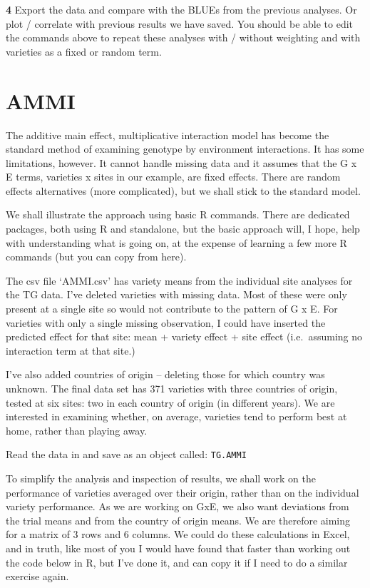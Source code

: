 \documentclass[
]{book}
\makeatletter
\newenvironment{kframe}{%
\medskip{}
\setlength{\fboxsep}{.8em}
 \def\at@end@of@kframe{}%
 \ifinner\ifhmode%
  \def\at@end@of@kframe{\end{minipage}}%
  \begin{minipage}{\columnwidth}%
 \fi\fi%
 \def\FrameCommand##1{\hskip\@totalleftmargin \hskip-\fboxsep
 \colorbox{shadecolor}{##1}\hskip-\fboxsep
     \hskip-\linewidth \hskip-\@totalleftmargin \hskip\columnwidth}%
 \MakeFramed {\advance\hsize-\width
   \@totalleftmargin\z@ \linewidth\hsize
   \@setminipage}}%
 {\par\unskip\endMakeFramed%
 \at@end@of@kframe}
\newenvironment{rmdblock}[1]
  {
  \begin{itemize}
  \renewcommand{\labelitemi}{
    \raisebox{-.7\height}[0pt][0pt]{
      {\setkeys{Gin}{width=3em,keepaspectratio}\texttt{[image: images/\#1]}}
    }
  }
  \setlength{\fboxsep}{1em}
  \begin{kframe}
  \item
  }
  {
  \end{kframe}
  \end{itemize}
  }
\newenvironment{rmdquiz}
  {\begin{rmdblock}{quiz}}
  {\end{rmdblock}}
\makeatother
\begin{document}
\begin{rmdquiz}
\textbf{4} Export the data and compare with the BLUEs from the previous analyses. Or plot / correlate with previous results we have saved. You should be able to edit the commands above to repeat these analyses with / without weighting and with varieties as a fixed or random term.
\end{rmdquiz}

\hypertarget{ammi}{%
\section{AMMI}\label{ammi}}

The additive main effect, multiplicative interaction model has become the standard method of examining genotype by environment interactions. It has some limitations, however. It cannot handle missing data and it assumes that the G x E terms, varieties x sites in our example, are fixed effects. There are random effects alternatives (more complicated), but we shall stick to the standard model.

We shall illustrate the approach using basic R commands. There are dedicated packages, both using R and standalone, but the basic approach will, I hope, help with understanding what is going on, at the expense of learning a few more R commands (but you can copy from here).

The csv file `AMMI.csv' has variety means from the individual site analyses for the TG data. I've deleted varieties with missing data. Most of these were only present at a single site so would not contribute to the pattern of G x E. For varieties with only a single missing observation, I could have inserted the predicted effect for that site: mean + variety effect + site effect (i.e.~assuming no interaction term at that site.)

I've also added countries of origin -- deleting those for which country was unknown. The final data set has 371 varieties with three countries of origin, tested at six sites: two in each country of origin (in different years). We are interested in examining whether, on average, varieties tend to perform best at home, rather than playing away.

Read the data in and save as an object called: \texttt{TG.AMMI}

To simplify the analysis and inspection of results, we shall work on the performance of varieties averaged over their origin, rather than on the individual variety performance. As we are working on GxE, we also want deviations from the trial means and from the country of origin means. We are therefore aiming for a matrix of 3 rows and 6 columns. We could do these calculations in Excel, and in truth, like most of you I would have found that faster than working out the code below in R, but I've done it, and can copy it if I need to do a similar exercise again.
\end{document}
